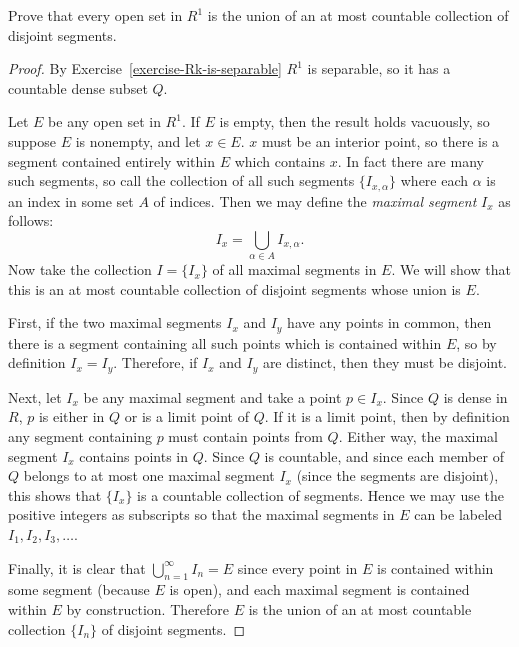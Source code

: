  Prove that every open set in $R^1$ is the union of an at
most countable collection of disjoint segments.
\begin{proof}
  By Exercise~\ref{exercise-Rk-is-separable} $R^1$ is separable, so it
  has a countable dense subset $Q$.

  Let $E$ be any open set in $R^1$. If $E$ is empty, then the result
  holds vacuously, so suppose $E$ is nonempty, and let $x\in E$. $x$
  must be an interior point, so there is a segment contained entirely
  within $E$ which contains $x$. In fact there are many such segments,
  so call the collection of all such segments $\{I_{x,\alpha}\}$ where
  each $\alpha$ is an index in some set $A$ of indices. Then we may
  define the {\em maximal segment} $I_x$ as follows:
  \begin{equation*}
    I_x = \bigcup_{\alpha\in A}I_{x,\alpha}.
  \end{equation*}
  Now take the collection $I = \{I_x\}$ of all maximal segments in
  $E$. We will show that this is an at most countable collection of
  disjoint segments whose union is $E$.

  First, if the two maximal segments $I_x$ and $I_y$ have any points
  in common, then there is a segment containing all such points which
  is contained within $E$, so by definition $I_x = I_y$. Therefore, if
  $I_x$ and $I_y$ are distinct, then they must be disjoint.

  Next, let $I_x$ be any maximal segment and take a point $p\in
  I_x$. Since $Q$ is dense in $R$, $p$ is either in $Q$ or is a limit
  point of $Q$. If it is a limit point, then by definition any segment
  containing $p$ must contain points from $Q$. Either way, the maximal
  segment $I_x$ contains points in $Q$. Since $Q$ is countable, and
  since each member of $Q$ belongs to at most one maximal segment
  $I_x$ (since the segments are disjoint), this shows that $\{I_x\}$
  is a countable collection of segments. Hence we may use the positive
  integers as subscripts so that the maximal segments in $E$ can be
  labeled $I_1, I_2, I_3, \dots$.

  Finally, it is clear that $\bigcup_{n=1}^\infty I_n = E$ since every
  point in $E$ is contained within some segment (because $E$ is open),
  and each maximal segment is contained within $E$ by
  construction. Therefore $E$ is the union of an at most countable
  collection $\{I_n\}$ of disjoint segments.
\end{proof}

